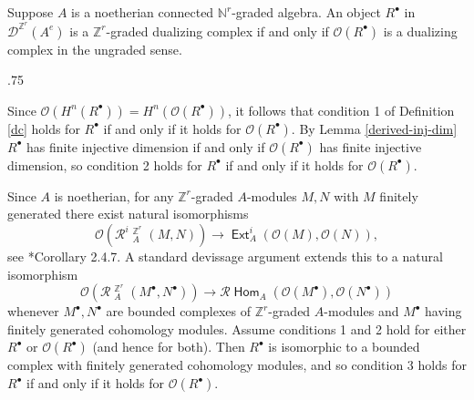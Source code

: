 \documentclass[11pt,fleqn]{article}
\makeatletter
\renewenvironment{proof}[1][\textit{Proof}]{\par
  \pushQED{\qed}%
  \normalfont \topsep.75\paraskip\relax
  \trivlist
  \item[\hskip\labelsep
        \itshape
    #1\@addpunct{.}]\ignorespaces
}{%
  \popQED\endtrivlist\@endpefalse
}
\newcommand\NN{\mathbb N}
\newcommand\ZZ{\mathbb Z}
\renewcommand\to{\longrightarrow}
\renewcommand\O{\mathcal O}
\newcommand\R{\mathcal R}
\newcommand\D{\mathcal D}
\DeclareMathOperator\Hom{\mathsf{Hom}}
\DeclareMathOperator\Ext{\mathsf{Ext}}
\DeclareMathOperator\HOM{\underline{\mathsf{Hom}}}
\makeatother
\begin{document}
\begin{Proposition}
Suppose $A$ is a noetherian connected $\NN^r$-graded algebra.
An object $R^\bullet$ in $\D^{\ZZ^r}(A^e)$ is a $\ZZ^r$-graded dualizing 
complex if and only if $\O(R^\bullet)$ is a dualizing complex in the ungraded 
sense.
\end{Proposition}
\begin{proof}
Since $\O(H^n(R^\bullet)) = H^n(\O(R^\bullet))$, it follows that condition 1 
of Definition \ref{dc} holds for $R^\bullet$ if and only if it holds for 
$\O(R^\bullet)$. By Lemma \ref{derived-inj-dim} $R^\bullet$ has finite 
injective dimension if and only if $\O(R^\bullet)$ has finite injective 
dimension, so condition 2 holds for $R^\bullet$ if and only if it holds for 
$\O(R^\bullet)$.

Since $A$ is noetherian, for any $\ZZ^r$-graded $A$-modules $M,N$ with $M$ 
finitely generated there exist natural isomorphisms
\[
  \O(\R^i\HOM_A^{\ZZ^r}(M,N)) \to \Ext^i_A(\O(M),\O(N)),
\]
see \cite{NV-graded-book3}*{Corollary 2.4.7}. A standard devissage argument 
extends this to a natural isomorphism
\[
  \O(\R\HOM_A^{\ZZ^r}(M^\bullet, N^\bullet)) 
    \to \R\Hom_A(\O(M^\bullet), \O(N^\bullet))
\]
whenever $M^\bullet, N^\bullet$ are bounded complexes of $\ZZ^r$-graded 
$A$-modules and $M^\bullet$ having finitely generated cohomology modules. 
Assume conditions 1 and 2 hold for either $R^\bullet$ or $\O(R^\bullet)$ (and 
hence for both). Then $R^\bullet$ is isomorphic to a bounded complex with 
finitely generated cohomology modules, and so condition 3 holds for $R^\bullet$
if and only if it holds for $\O(R^\bullet)$.
\end{proof}

\begin{bibdiv}
\begin{biblist}
\end{biblist}
\end{bibdiv}
\end{document}
